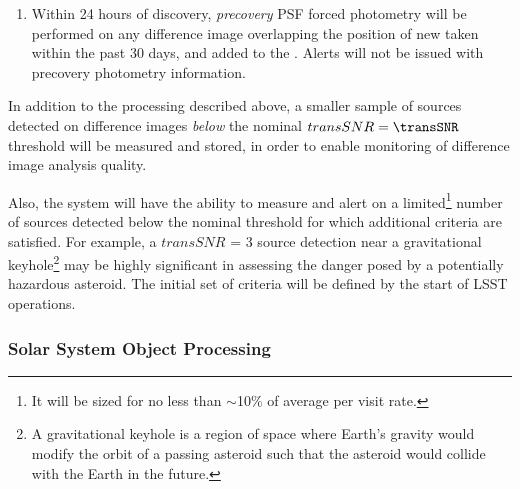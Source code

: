 \documentclass[SE,lsstdraft,toc]{lsstdoc}
\begin{document}
\begin{enumerate}
\item Within 24 hours of discovery, \emph{precovery} PSF forced photometry will be performed on any difference image overlapping the position of new \DIAObjects taken within the past 30 days, and added to the . Alerts will not be issued with precovery photometry information.
\end{enumerate}

In addition to the processing described above, a smaller sample of sources detected on difference images \emph{below} the nominal $transSNR = \transSNR$  threshold will be measured and stored, in order to enable monitoring of difference image analysis quality.

Also, the system will have the ability to measure and alert on a limited\footnote{It will be sized for no less than $\sim$10\% of average \DIASource per visit rate.} number of sources detected below the nominal threshold for which additional criteria are satisfied. For example, a $transSNR$ = 3 source detection near a gravitational keyhole\footnote{
A gravitational keyhole is a region of space where Earth's gravity would modify the orbit of a passing asteroid
such that the asteroid would collide with the Earth in the future.}
may be highly significant in assessing the danger posed by a potentially hazardous asteroid.
The initial set of criteria will be defined by the start of LSST operations.

\subsubsection{Solar System Object Processing}
\label{sec:ssProcessing}
\end{document}
